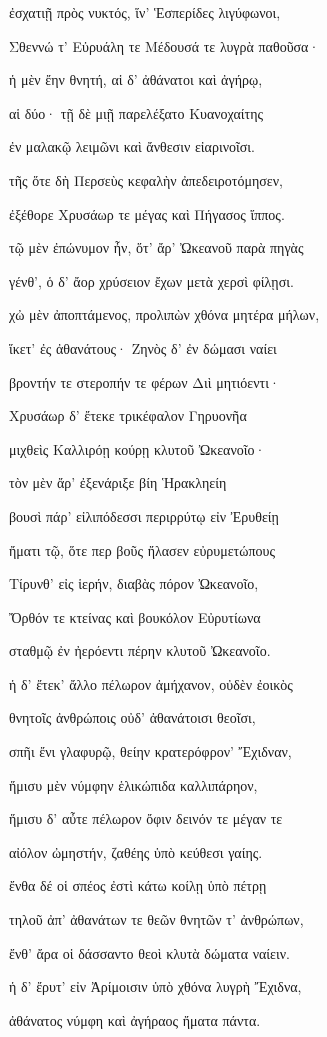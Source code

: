 \begin{pages}
\begin{Leftside}
ἐσχατιῇ πρὸς νυκτός, ἵν' Ἑσπερίδες λιγύφωνοι, 

Σθεννώ τ' Εὐρυάλη τε Μέδουσά τε λυγρὰ παθοῦσα· 

ἡ μὲν ἔην θνητή, αἱ δ' ἀθάνατοι καὶ ἀγήρῳ, 

αἱ δύο· τῇ δὲ μιῇ παρελέξατο Κυανοχαίτης 

ἐν μαλακῷ λειμῶνι καὶ ἄνθεσιν εἰαρινοῖσι. 

τῆς ὅτε δὴ Περσεὺς κεφαλὴν ἀπεδειροτόμησεν,  

ἐξέθορε Χρυσάωρ τε μέγας καὶ Πήγασος ἵππος.

τῷ μὲν ἐπώνυμον ἦν, ὅτ' ἄρ' Ὠκεανοῦ παρὰ πηγὰς

γένθ', ὁ δ' ἄορ χρύσειον ἔχων μετὰ χερσὶ φίλῃσι. 

χὠ μὲν ἀποπτάμενος, προλιπὼν χθόνα μητέρα μήλων,

ἵκετ' ἐς ἀθανάτους· Ζηνὸς δ' ἐν δώμασι ναίει  

βροντήν τε στεροπήν τε φέρων Διὶ μητιόεντι·

Χρυσάωρ δ' ἔτεκε τρικέφαλον Γηρυονῆα

μιχθεὶς Καλλιρόῃ κούρῃ κλυτοῦ Ὠκεανοῖο· 

τὸν μὲν ἄρ' ἐξενάριξε βίη Ἡρακληείη

βουσὶ πάρ' εἰλιπόδεσσι περιρρύτῳ εἰν Ἐρυθείῃ 

ἤματι τῷ, ὅτε περ βοῦς ἤλασεν εὐρυμετώπους 

Τίρυνθ' εἰς ἱερήν, διαβὰς πόρον Ὠκεανοῖο, 

Ὄρθόν τε κτείνας καὶ βουκόλον Εὐρυτίωνα

σταθμῷ ἐν ἠερόεντι πέρην κλυτοῦ Ὠκεανοῖο.

ἡ δ' ἔτεκ' ἄλλο πέλωρον ἀμήχανον, οὐδὲν ἐοικὸς  

θνητοῖς ἀνθρώποις οὐδ' ἀθανάτοισι θεοῖσι, 

σπῆι ἔνι γλαφυρῷ, θείην κρατερόφρον' Ἔχιδναν, 

ἥμισυ μὲν νύμφην ἑλικώπιδα καλλιπάρηον, 

ἥμισυ δ' αὖτε πέλωρον ὄφιν δεινόν τε μέγαν τε

αἰόλον ὠμηστήν, ζαθέης ὑπὸ κεύθεσι γαίης.  

ἔνθα δέ οἱ σπέος ἐστὶ κάτω κοίλῃ ὑπὸ πέτρῃ

τηλοῦ ἀπ' ἀθανάτων τε θεῶν θνητῶν τ' ἀνθρώπων,

ἔνθ' ἄρα οἱ δάσσαντο θεοὶ κλυτὰ δώματα ναίειν.

ἡ δ' ἔρυτ' εἰν Ἀρίμοισιν ὑπὸ χθόνα λυγρὴ Ἔχιδνα, 

ἀθάνατος νύμφη καὶ ἀγήραος ἤματα πάντα. 


\end{Leftside}
\end{pages}
